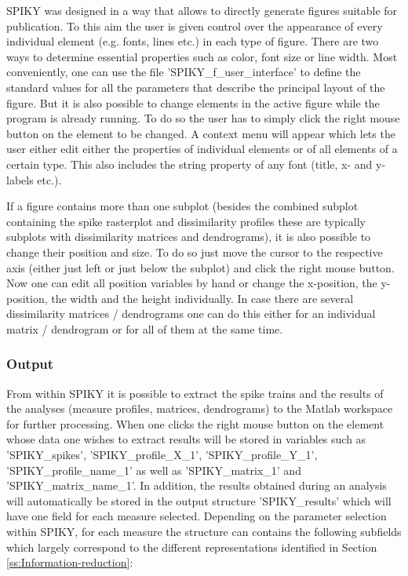 \documentclass[10pt,twocolumn]{elsart5p}
\begin{document}
SPIKY was designed in a way that allows to directly generate figures suitable for publication. To this aim the user is given control over the appearance of every individual element (e.g. fonts, lines etc.) in each type of figure. There are two ways to determine essential properties such as color, font size or line width. Most conveniently, one can use the file 'SPIKY\_f\_user\_interface' to define the standard values for all the parameters that describe the principal layout of the figure. But it is also possible to change elements in the active figure while the program is already running. To do so the user has to simply click the right mouse button on the element to be changed. A context menu will appear which lets the user either edit either the properties of individual elements or of all elements of a certain type. This also includes the string property of any font (title, x- and y-labels etc.).

If a figure contains more than one subplot (besides the combined subplot containing the spike rasterplot and dissimilarity profiles these are typically subplots with dissimilarity matrices and dendrograms), it is also possible to change their position and size. To do so just move the cursor to the respective axis (either just left or just below the subplot) and click the right mouse button. Now one can edit all position variables by hand or change the x-position, the y-position, the width and the height individually. In case there are several dissimilarity matrices / dendrograms one can do this either for an individual matrix / dendrogram or for all of them at the same time.


\subsubsection{\label{sss:Output} Output}

From within SPIKY it is possible to extract the spike trains and the results of the analyses (measure profiles, matrices, dendrograms) to the Matlab workspace for further processing. When one clicks the right mouse button on the element whose data one wishes to extract results will be stored in variables such as 'SPIKY\_spikes', 'SPIKY\_profile\_X\_1', 'SPIKY\_profile\_Y\_1', 'SPIKY\_profile\_name\_1' as well as 'SPIKY\_matrix\_1' and 'SPIKY\_matrix\_name\_1'. In addition, the results obtained during an analysis will automatically be stored in the output structure 'SPIKY\_results' which will have one field for each measure selected. Depending on the parameter selection within SPIKY, for each measure the structure can contains the following subfields which largely correspond to the different representations identified in Section \ref{ss:Information-reduction}:
\end{document}
